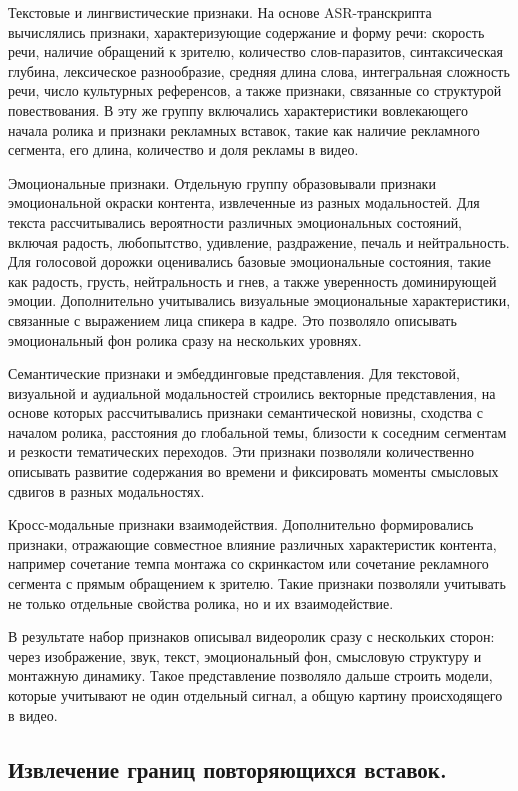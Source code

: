 \documentclass[times]{itmo-student-thesis}
\begin{document}
Текстовые и лингвистические признаки. На основе ASR-транскрипта вычислялись признаки, характеризующие содержание и форму речи: скорость речи, наличие обращений к зрителю, количество слов-паразитов, синтаксическая глубина, лексическое разнообразие, средняя длина слова, интегральная сложность речи, число культурных референсов, а также признаки, связанные со структурой повествования. В эту же группу включались характеристики вовлекающего начала ролика и признаки рекламных вставок, такие как наличие рекламного сегмента, его длина, количество и доля рекламы в видео.

Эмоциональные признаки. Отдельную группу образовывали признаки эмоциональной окраски контента, извлеченные из разных модальностей. Для текста рассчитывались вероятности различных эмоциональных состояний, включая радость, любопытство, удивление, раздражение, печаль и нейтральность. Для голосовой дорожки оценивались базовые эмоциональные состояния, такие как радость, грусть, нейтральность и гнев, а также уверенность доминирующей эмоции. Дополнительно учитывались визуальные эмоциональные характеристики, связанные с выражением лица спикера в кадре. Это позволяло описывать эмоциональный фон ролика сразу на нескольких уровнях.

Семантические признаки и эмбеддинговые представления. Для текстовой, визуальной и аудиальной модальностей строились векторные представления, на основе которых рассчитывались признаки семантической новизны, сходства с началом ролика, расстояния до глобальной темы, близости к соседним сегментам и резкости тематических переходов. Эти признаки позволяли количественно описывать развитие содержания во времени и фиксировать моменты смысловых сдвигов в разных модальностях.

Кросс-модальные признаки взаимодействия. Дополнительно формировались признаки, отражающие совместное влияние различных характеристик контента, например сочетание темпа монтажа со скринкастом или сочетание рекламного сегмента с прямым обращением к зрителю. Такие признаки позволяли учитывать не только отдельные свойства ролика, но и их взаимодействие.

В результате набор признаков описывал видеоролик сразу с нескольких сторон: через изображение, звук, текст, эмоциональный фон, смысловую структуру и монтажную динамику. Такое представление позволяло дальше строить модели, которые учитывают не один отдельный сигнал, а общую картину происходящего в видео.

\subsection{Извлечение границ повторяющихся вставок.}
\end{document}
